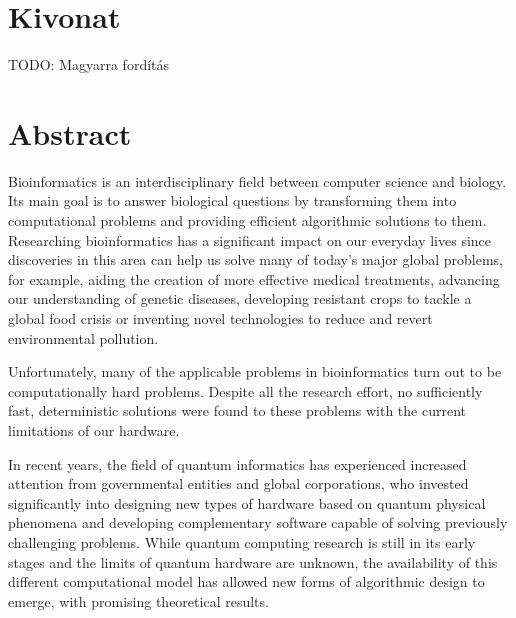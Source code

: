 \setcounter{page}{1}

\selecthungarian

\chapter*{Kivonat}

TODO: Magyarra fordítás


\vfill
\selectenglish


\chapter*{Abstract}

Bioinformatics is an interdisciplinary field between computer science and biology. Its main goal is to answer biological questions by transforming them into computational problems and providing efficient algorithmic solutions to them. Researching bioinformatics has a significant impact on our everyday lives since discoveries in this area can help us solve many of today's major global problems, for example, aiding the creation of more effective medical treatments, advancing our understanding of genetic diseases, developing resistant crops to tackle a global food crisis or inventing novel technologies to reduce and revert environmental pollution.

Unfortunately, many of the applicable problems in bioinformatics turn out to be computationally hard problems. Despite all the research effort, no sufficiently fast, deterministic solutions were found to these problems with the current limitations of our hardware.

In recent years, the field of quantum informatics has experienced increased attention from governmental entities and global corporations, who invested significantly into designing new types of hardware based on quantum physical phenomena and developing complementary software capable of solving previously challenging problems. While quantum computing research is still in its early stages and the limits of quantum hardware are unknown, the availability of this different computational model has allowed new forms of algorithmic design to emerge, with promising theoretical results.

